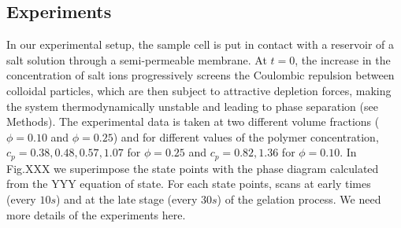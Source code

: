 \documentclass[twocolumn,showpacs,amsmath,amssymb,pre,superscriptaddress]{revtex4}
\begin{document}
\subsection*{Experiments}

In our experimental setup, the sample cell is put in contact with a reservoir of a salt solution through a semi-permeable membrane.
At $t=0$, the increase in the concentration of salt ions progressively screens the Coulombic repulsion between colloidal particles,
which are then subject to attractive depletion forces, making the system thermodynamically unstable and leading to phase separation (see Methods).
The experimental data is taken at two different volume fractions ($\phi=0.10$ and $\phi=0.25$) and for different values
of the polymer concentration, $c_p=0.38,0.48,0.57,1.07$ for $\phi=0.25$ and $c_p=0.82,1.36$ for $\phi=0.10$.
In Fig.XXX we superimpose the state points with the phase diagram calculated from the YYY equation of state.
For each state points, scans at early times (every $10s$) and at the late stage (every $30s$) of the gelation process.
{\color{blue}We need more details of the experiments here}.
\end{document}
